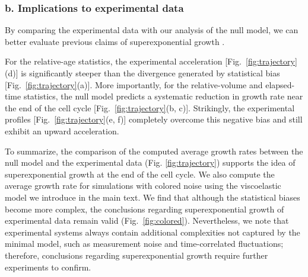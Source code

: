 \documentclass[aps, prl, longbibliography, linenumbers, superscriptaddress]{revtex4-2}
\newcommand{\blue}{\color{blue}}
\newcommand{\blue}{}
\begin{document}
{\blue \subsubsection{b. Implications to experimental data}
By comparing the experimental data with our analysis of the null model, we can better evaluate previous claims of superexponential growth \cite{Kar2021distinguishing, Cylke2023super, Cylke2025gene}. 

For the relative-age statistics, the experimental acceleration [Fig.~\ref{fig:trajectory}(d)] is significantly steeper than the divergence generated by statistical bias [Fig.~\ref{fig:trajectory}(a)]. More importantly, for the relative-volume and elapsed-time statistics, the null model predicts a systematic reduction in growth rate near the end of the cell cycle [Fig.~\ref{fig:trajectory}(b, c)]. Strikingly, the experimental profiles [Fig.~\ref{fig:trajectory}(e, f)] completely overcome this negative bias and still exhibit an upward acceleration.

To summarize, the comparison of the computed average growth rates between the null model and the experimental data (Fig. \ref{fig:trajectory}) supports the idea of superexponential growth at the end of the cell cycle. We also compute the average growth rate for simulations with colored noise using the viscoelastic model we introduce in the main text. We find that although the statistical biases become more complex, the conclusions regarding superexponential growth of experimental data remain valid (Fig.~\ref{fig:colored}). Nevertheless, we note that experimental systems always contain additional complexities not captured by the minimal model, such as measurement noise and time-correlated fluctuations; therefore, conclusions regarding superexponential growth require further experiments to confirm.}




\end{document}
